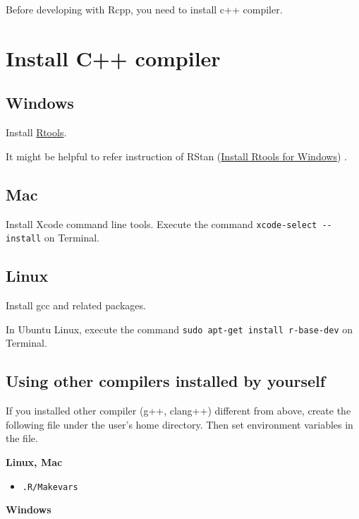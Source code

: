 \documentclass[]{book}
\providecommand{\tightlist}{%
  \setlength{\itemsep}{0pt}\setlength{\parskip}{0pt}}
\theoremstyle{definition}
\theoremstyle{definition}
\theoremstyle{remark}
\begin{document}
Before developing with Rcpp, you need to install c++ compiler.

\section{Install C++ compiler}\label{install-c-compiler}

\subsection{Windows}\label{windows}

Install
\href{https://cran.r-project.org/bin/windows/Rtools/index.html}{Rtools}.

It might be helpful to refer instruction of RStan
(\href{https://github.com/stan-dev/rstan/wiki/Install-Rtools-for-Windows}{Install
Rtools for Windows}) .

\subsection{Mac}\label{mac}

Install Xcode command line tools. Execute the command
\texttt{xcode-select\ -\/-install} on Terminal.

\subsection{Linux}\label{linux}

Install gcc and related packages.

In Ubuntu Linux, execute the command
\texttt{sudo\ apt-get\ install\ r-base-dev} on Terminal.

\subsection{Using other compilers installed by
yourself}\label{using-other-compilers-installed-by-yourself}

If you installed other compiler (g++, clang++) different from above,
create the following file under the user's home directory. Then set
environment variables in the file.

\textbf{Linux, Mac}

\begin{itemize}
\tightlist
\item
  \texttt{.R/Makevars}
\end{itemize}

\textbf{Windows}
\end{document}
